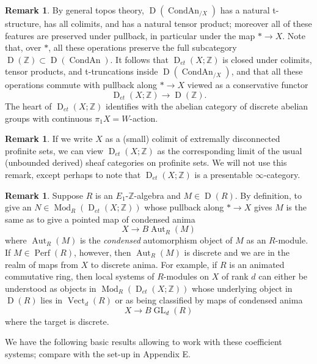 \documentclass[12pt]{article}
\theoremstyle{definition}
\newtheorem{remark}[theorem]{Remark}
\newcommand{\on}{\operatorname}
\newcommand{\mbb}{\mathbb}
\begin{document}
\begin{remark} By general topos theory, $\on{D}(\on{CondAn}_{/X})$ has a natural t-structure, has all colimits, and has a natural tensor product; moreover all of these features are preserved under pullback, in particular under the map $\ast \to X$.  Note that, over $\ast$, all these operations preserve the full subcategory $\on{D}(\mbb{Z})\subset\on{D}(\on{CondAn})$.  It follows that $\on{D}_{et}(X;\mbb{Z})$ is closed under colimits, tensor products, and t-truncations inside $\on{D}(\on{CondAn}_{/X})$, and that all these operations commute with pullback along $\ast \to X$ viewed as a conservative functor
$$\on{D}_{et}(X;\mbb{Z})\to\on{D}(\mbb{Z}).$$
The heart of $\on{D}_{et}(X;\mbb{Z})$ identifies with the abelian category of discrete abelian groups with continuous $\pi_1X = W$-action.
\end{remark}

\begin{remark}
If we write $X$ as a (small) colimit of extremally disconnected profinite sets, we can view $\on{D}_{et}(X;\mbb{Z})$ as the corresponding limit of the usual (unbounded derived) sheaf categories on profinite sets.  We will not use this remark, except perhaps to note that $\on{D}_{et}(X;\mbb{Z})$ is a presentable $\infty$-category.
\end{remark}

\begin{remark}
Suppose $R$ is an $E_1$-$\mbb{Z}$-algebra and $M\in\on{D}(R)$.  By definition, to give an $N\in\on{Mod}_R(\on{D}_{et}(X;\mbb{Z}))$ whose pullback along $\ast \to X$ gives $M$ is the same as to give a pointed map of condensed anima
$$X \to B\on{Aut}_R(M)$$
where $\on{Aut}_R(M)$ is the \emph{condensed} automorphism object of $M$ as an $R$-module.  If $M\in\on{Perf}(R)$, however, then $\on{Aut}_R(M)$ is discrete and we are in the realm of maps from $X$ to discrete anima.  For example, if $R$ is an animated commutative ring, then local systems of $R$-modules on $X$ of rank $d$ can either be understood as objects in $\on{Mod}_R(\on{D}_{et}(X;\mbb{Z}))$ whose underlying object in $\on{D}(R)$ lies in $\on{Vect}_d(R)$ or as being classified by maps of condensed anima
$$X \to B\on{GL}_d(R)$$
where the target is discrete.
\end{remark}

We have the following basic results allowing to work with these coefficient systems; compare with the set-up in \cite{locsysres} Appendix E.
\end{document}
